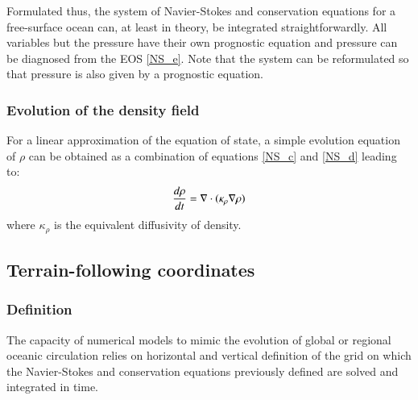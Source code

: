 Formulated thus, the system of Navier-Stokes and conservation equations for a free-surface ocean can, at least in theory, be integrated straightforwardly. All variables but the pressure have their own prognostic equation and pressure can be diagnosed from the EOS \ref{NS_e}. Note that the system can be reformulated so that pressure is also given by a prognostic equation.

\subsubsection{Evolution of the density field}
For a linear approximation of the equation of state, a simple evolution equation of $\rho$ can be obtained as a combination of equations \ref{NS_c} and \ref{NS_d} leading to:
\begin{equation}
\displaystyle
\frac{d \rho}{d t}=
 \mathbf{\nabla}\cdot\color{black}(\kappa_{\rho} \mathbf{\nabla}{\rho})
\label{eq_diff_cart}
\end{equation}
where $\kappa_{\rho}$ is the equivalent diffusivity of density.

 
\subsection{Terrain-following coordinates}
\label{subsection_scoord}

\subsubsection{Definition}
The capacity of numerical models to mimic the evolution of global or regional oceanic circulation relies on horizontal and vertical definition of the grid on which the Navier-Stokes and conservation equations previously defined are solved and integrated in time.

